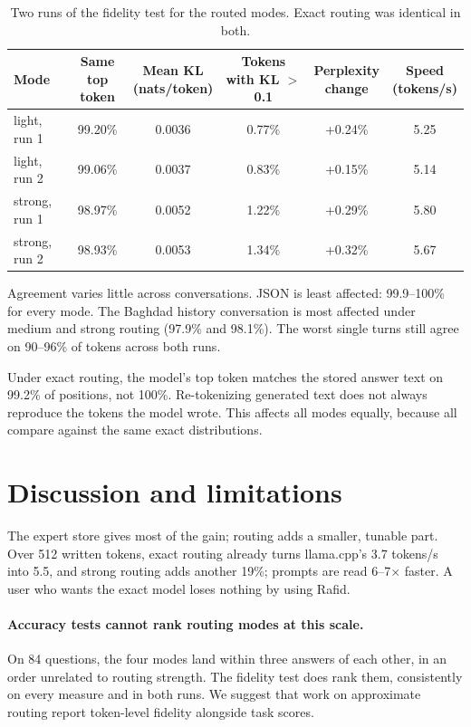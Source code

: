 \begin{table}[t]
\centering\small
\caption{Two runs of the fidelity test for the routed modes. Exact routing was identical in both.}
\label{tab:repeat}
\begin{tabular}{lccccc}
\toprule
Mode & \makecell{Same top\\token} & \makecell{Mean KL\\(nats/token)} & \makecell{Tokens with\\KL $>$ 0.1} & \makecell{Perplexity\\change} & \makecell{Speed\\(tokens/s)} \\
\midrule
light, run 1 & 99.20\% & 0.0036 & 0.77\% & +0.24\% & 5.25 \\
light, run 2 & 99.06\% & 0.0037 & 0.83\% & +0.15\% & 5.14 \\
strong, run 1 & 98.97\% & 0.0052 & 1.22\% & +0.29\% & 5.80 \\
strong, run 2 & 98.93\% & 0.0053 & 1.34\% & +0.32\% & 5.67 \\
\bottomrule
\end{tabular}
\end{table}

Agreement varies little across conversations. JSON is least affected: 99.9--100\% for every mode. The Baghdad history conversation is most affected under medium and strong routing (97.9\% and 98.1\%). The worst single turns still agree on 90--96\% of tokens across both runs.

Under exact routing, the model's top token matches the stored answer text on 99.2\% of positions, not 100\%. Re-tokenizing generated text does not always reproduce the tokens the model wrote. This affects all modes equally, because all compare against the same exact distributions.

\section{Discussion and limitations}
The expert store gives most of the gain; routing adds a smaller, tunable part. Over 512 written tokens, exact routing already turns llama.cpp's 3.7 tokens/s into 5.5, and strong routing adds another 19\%; prompts are read 6--7$\times$ faster. A user who wants the exact model loses nothing by using Rafid.

\paragraph{Accuracy tests cannot rank routing modes at this scale.} On 84 questions, the four modes land within three answers of each other, in an order unrelated to routing strength. The fidelity test does rank them, consistently on every measure and in both runs. We suggest that work on approximate routing report token-level fidelity alongside task scores.

